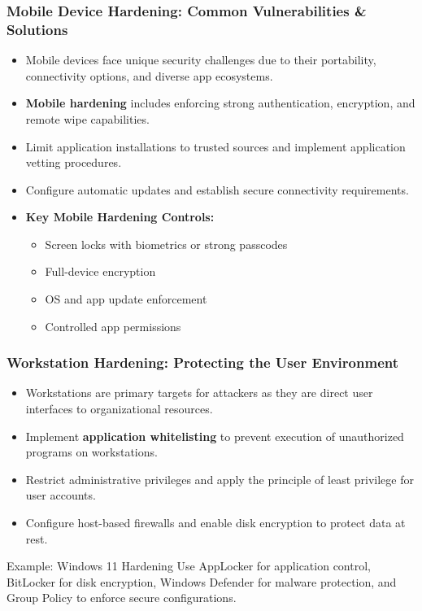 \documentclass{beamer}
\begin{document}
\begin{frame}
    \frametitle{Mobile Device Hardening: Common Vulnerabilities \& Solutions}
    
    \begin{itemize}
        \item Mobile devices face unique security challenges due to their portability, connectivity options, and diverse app ecosystems.
        \item \textbf{Mobile hardening} includes enforcing strong authentication, encryption, and remote wipe capabilities.
        \item Limit application installations to trusted sources and implement application vetting procedures.
        \item Configure automatic updates and establish secure connectivity requirements.
    \end{itemize}
    
    \begin{itemize}
        \item[] \textbf{Key Mobile Hardening Controls:}
        \begin{itemize}
            \item Screen locks with biometrics or strong passcodes
            \item Full-device encryption
            \item OS and app update enforcement
            \item Controlled app permissions
        \end{itemize}
    \end{itemize}
\end{frame}

\begin{frame}
    \frametitle{Workstation Hardening: Protecting the User Environment}
    
    \begin{itemize}
        \item Workstations are primary targets for attackers as they are direct user interfaces to organizational resources.
        \item Implement \textbf{application whitelisting} to prevent execution of unauthorized programs on workstations.
        \item Restrict administrative privileges and apply the principle of least privilege for user accounts.
        \item Configure host-based firewalls and enable disk encryption to protect data at rest.
    \end{itemize}
    
    \begin{exampleblock}{Example: Windows 11 Hardening}
        Use AppLocker for application control, BitLocker for disk encryption, Windows Defender for malware protection, and Group Policy to enforce secure configurations.
    \end{exampleblock}
\end{frame}
\end{document}
